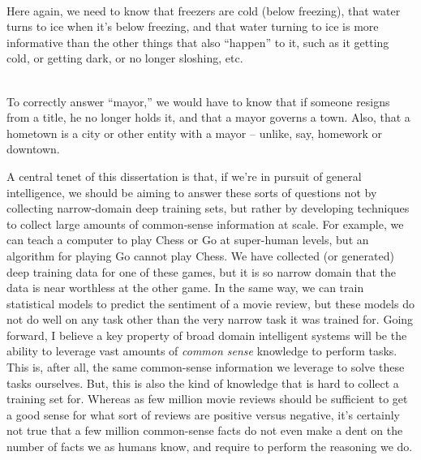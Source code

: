 \begin{displayquote}
   \\
  Here again, we need to know that freezers are cold (below freezing), that water turns to ice
    when it's below freezing, and that water turning to ice is more informative than the other things
    that also ``happen'' to it, such as it getting cold, or getting dark, or no longer sloshing, etc.
\end{displayquote}

\begin{displayquote}
   \\
  To correctly answer ``mayor,'' we would have to know that if someone resigns from a title, he no longer
    holds it, and that a mayor governs a town.
  Also, that a hometown is a city or other entity with a mayor -- unlike, say, homework or downtown.
\end{displayquote}

%
%

A central tenet of this dissertation is that, if we're in pursuit of general intelligence, we should be
  aiming to answer these sorts of questions not by collecting narrow-domain deep training sets, but rather
  by developing techniques to collect large amounts of common-sense information at scale.
For example, we can teach a computer to play Chess or Go at super-human levels, but an algorithm
  for playing Go cannot play Chess.
We have collected (or generated) deep training data for one of these games, but it is so narrow domain
  that the data is near worthless at the other game.
In the same way, we can train statistical models to predict the sentiment of a movie review, but these models
  do not do well on any task other than the very narrow task it was trained for.
Going forward, I believe a key property of broad domain intelligent systems will be the ability to 
  leverage vast amounts of \textit{common sense} knowledge to perform tasks.
This is, after all, the same common-sense information we leverage to solve these tasks ourselves.
But, this is also the kind of knowledge that is hard to collect a training set for.
Whereas as few million movie reviews should be sufficient to get a good sense for what sort of reviews
  are positive versus negative, it's certainly not true that a few million common-sense facts do
  not even make a dent on the number of facts we as humans know, and require to perform the reasoning
  we do.

